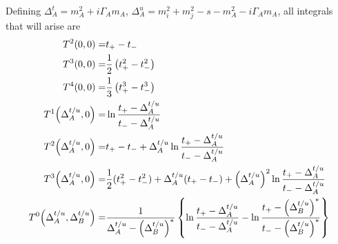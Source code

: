 \documentclass[../main.tex]{subfiles}
\begin{document}
            Defining \(\Delta_A^t = m_A^2 + i\Gamma_A m_A\), \(\Delta_A^u = m_i^2 + m_j^2 - s - m_A^2 - i\Gamma_A m_A\), all integrals that will arise are
            \begin{subequations}
                \begin{align}
                    T^2(0, 0) =                                     & t_+ - t_-                                                                                                                                                                                                                                                 \\
                    T^3(0, 0) =                                     & \frac{1}{2} \pclosed{t_+^2 - t_-^2}                                                                                                                                                                                                                       \\
                    T^4(0, 0) =                                     & \frac{1}{3} \pclosed{t_+^3 - t_-^3}                                                                                                                                                                                                                       \\
                    T^1\!\pclosed{\Delta_A^{t/u}, 0} =              & \ln\frac{t_+ - \Delta_A^{t/u}}{t_- - \Delta_A^{t/u}}                                                                                                                                                                                                      \\
                    T^2\!\pclosed{\Delta_A^{t/u}, 0} =              & t_+ - t_- + \Delta_A^{t/u} \ln\frac{t_+ - \Delta_A^{t/u}}{t_- - \Delta_A^{t/u}}                                                                                                                                                                           \\
                    T^3\!\pclosed{\Delta_A^{t/u}, 0} =              & \frac{1}{2}(t_+^2 - t_-^2) + \Delta_A^{t/u}(t_+ - t_-) + \pclosed{\Delta_A^{t/u}}^2 \ln\frac{t_+ - \Delta_A^{t/u}}{t_- - \Delta_A^{t/u}}                                                                                                                  \\
                    T^0\!\pclosed{\Delta_A^{t/u}, \Delta_B^{t/u}} = & \frac{1}{\Delta_A^{t/u} - \pclosed{\Delta_B^{t/u}}^\ast} \cclosed{\ln\frac{t_+ - \Delta_A^{t/u}}{t_- - \Delta_A^{t/u}} - \ln\frac{t_+ - \pclosed{\Delta_B^{t/u}}^\ast}{t_- - \pclosed{\Delta_B^{t/u}}^\ast}}                                              \\

\end{align}
\end{subequations}
\end{document}
